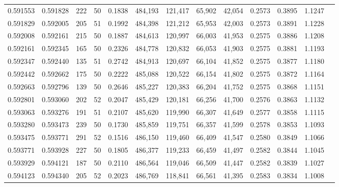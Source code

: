 \begin{tabular}{rrrrrrrrrrrrr}
0.591553 & 0.591828 &   222 &  50 &                                     0.1838 & 484,193 & 121,417 &  65,902 &  42,054 & 0.2573 & 0.3895 & 1.1247 \\
0.591829 & 0.592005 &   205 &  51 &                                     0.1992 & 484,398 & 121,212 &  65,953 &  42,003 & 0.2573 & 0.3891 & 1.1228 \\
0.592008 & 0.592161 &   215 &  50 &                                     0.1887 & 484,613 & 120,997 &  66,003 &  41,953 & 0.2575 & 0.3886 & 1.1208 \\
0.592161 & 0.592345 &   165 &  50 &                                     0.2326 & 484,778 & 120,832 &  66,053 &  41,903 & 0.2575 & 0.3881 & 1.1193 \\
0.592347 & 0.592440 &   135 &  51 &                                     0.2742 & 484,913 & 120,697 &  66,104 &  41,852 & 0.2575 & 0.3877 & 1.1180 \\
0.592442 & 0.592662 &   175 &  50 &                                     0.2222 & 485,088 & 120,522 &  66,154 &  41,802 & 0.2575 & 0.3872 & 1.1164 \\
0.592663 & 0.592796 &   139 &  50 &                                     0.2646 & 485,227 & 120,383 &  66,204 &  41,752 & 0.2575 & 0.3868 & 1.1151 \\
0.592801 & 0.593060 &   202 &  52 &                                     0.2047 & 485,429 & 120,181 &  66,256 &  41,700 & 0.2576 & 0.3863 & 1.1132 \\
0.593063 & 0.593276 &   191 &  51 &                                     0.2107 & 485,620 & 119,990 &  66,307 &  41,649 & 0.2577 & 0.3858 & 1.1115 \\
0.593280 & 0.593473 &   239 &  50 &                                     0.1730 & 485,859 & 119,751 &  66,357 &  41,599 & 0.2578 & 0.3853 & 1.1093 \\
0.593475 & 0.593771 &   291 &  52 &                                     0.1516 & 486,150 & 119,460 &  66,409 &  41,547 & 0.2580 & 0.3849 & 1.1066 \\
0.593771 & 0.593928 &   227 &  50 &                                     0.1805 & 486,377 & 119,233 &  66,459 &  41,497 & 0.2582 & 0.3844 & 1.1045 \\
0.593929 & 0.594121 &   187 &  50 &                                     0.2110 & 486,564 & 119,046 &  66,509 &  41,447 & 0.2582 & 0.3839 & 1.1027 \\
0.594123 & 0.594340 &   205 &  52 &                                     0.2023 & 486,769 & 118,841 &  66,561 &  41,395 & 0.2583 & 0.3834 & 1.1008 \\

\end{tabular}
